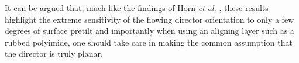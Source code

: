 It can be argued that, much like the findings of Horn \textit{et al.} \cite{Horn2003}, these results highlight the extreme sensitivity of the flowing director orientation to only a few degrees of surface pretilt and importantly when using an aligning layer such as a rubbed polyimide, one should take care in making the common assumption that the director is truly planar.
